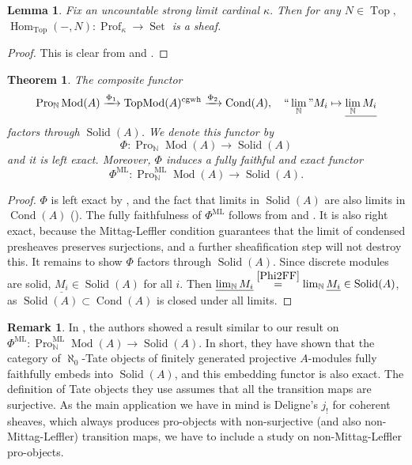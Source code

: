 \documentclass[11pt]{amsart}
\newcommand{\ra}{\rightarrow} %
\newcommand{\xra}{\xrightarrow}
\newcommand{\N}{\mathbb{N}}
\newcommand{\Set}{{\operatorname{\mathrm{Set}}}}
\newcommand{\Hom}{\operatorname{Hom}}
\newcommand{\Mod}{\operatorname{Mod}}
\newcommand{\Top}{\operatorname{Top}}
\newcommand{\Prof}{\operatorname{Prof}}
\newcommand{\cgwh}{\operatorname{cgwh}}
\newcommand{\ML}{\operatorname{ML}}
\newcommand{\TopMod}{\operatorname{TopMod}}
\renewcommand{\lim}{\operatornamewithlimits{\rm{lim}}}
\newcommand{\Cond}{\operatorname{Cond}}
\newcommand{\Solid}{\operatorname{Solid}}
\newcommand{\ul}{\underline}
\newcommand{\Pro}{\operatorname{Pro}}
\theoremstyle{plain}
\newtheorem{lem}[prop]{Lemma}
\newtheorem{thm}[prop]{Theorem}
\theoremstyle{definition}
\newtheorem{rmk}[prop]{Remark}
\numberwithin{equation}{prop}
\begin{document}
\begin{lem}\label{noneedshifify}
Fix an uncountable strong limit cardinal $\kappa.$
Then for any $N\in \Top,$
$\Hom_{\Top}(-,N): \Prof_{\kappa}\ra \Set$ 
is a sheaf.
\end{lem}
\begin{proof}
This is clear from \cite[p. 12, remarks after the proof of Proposition 2.7]{CS} and \cite[Example 1.5]{CS}.
\end{proof}


\begin{thm}\label{thm1}
The composite functor
$$\Pro_{\N}\Mod(A)\xra{\Phi_1} \TopMod(A)^{\cgwh}\xra{\Phi_2}\Cond(A), \quad ``\lim_\N" M_i\mapsto \ul{\lim_\N M_i}$$
factors through $\Solid(A)$.
We denote this functor by
$$\Phi:\Pro_{\N}\Mod(A)\ra \Solid(A)$$
and it is left exact.
Moreover, $\Phi$ induces a fully faithful and exact functor
$$\Phi^{\ML}:\Pro_{\N}^{\ML}\Mod(A)\ra \Solid(A).$$
\end{thm}
\begin{proof}
$\Phi$ is left exact by ,  and the fact that limits in $\Solid(A)$  are also limits in $\Cond(A)$ (\cite[Proposition 7.5(i)]{CS}).
The fully faithfulness of $\Phi^{\ML}$ follows from  and .
It is also right exact, because the Mittag-Leffler condition guarantees that the limit of condensed presheaves preserves surjections, and a further sheafification step will not destroy this.
It remains to show $\Phi$ factors through $\Solid(A)$.
Since discrete modules are solid, $\ul{M_i}\in \Solid(A)$ for all $i$.
Then $\ul{\lim_\N M_i}\stackrel{\ref{Phi2FF}}{=}\lim_\N \ul{M_i}\in \Solid(A)$, as $\Solid(A)\subset \Cond(A)$ is closed under all limits.
\end{proof}
\begin{rmk}
In \cite{MPV_TateCondv2}, the authors showed a result similar to our result on
$\Phi^{\ML}:\Pro^{\ML}_\N \Mod(A)\ra \Solid(A)$.
In short, they have shown that the category of $\aleph_0$-Tate objects of finitely generated projective $A$-modules fully faithfully embeds into $\Solid(A)$, and this embedding functor is also exact. 
The definition of Tate objects they use assumes that all the transition maps are surjective.
As the main application we have in mind is Deligne's $j_!$ for coherent sheaves, which always produces pro-objects with non-surjective (and also non-Mittag-Leffler) transition maps, we have to include a study on non-Mittag-Leffler pro-objects.
\end{rmk}
\end{document}
